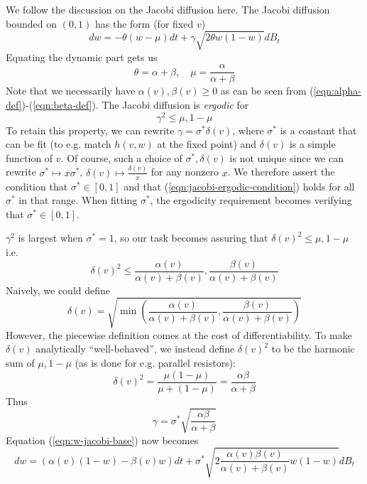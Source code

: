 \documentclass[letterpaper,12pt]{article}
\numberwithin{table}{section}
\numberwithin{figure}{section}
\numberwithin{equation}{section}
\begin{document}
\begin{flushleft}
    We follow the discussion \cite{dg} on the Jacobi diffusion here. The Jacobi diffusion bounded on $(0, 1)$ has the form (for fixed $v$)
    \begin{equation}
        \label{eqn:w-jacobi-base}
        dw = -\theta (w - \mu) dt + \gamma\sqrt{2\theta w (1 - w)} dB_t
    \end{equation}
    Equating the dynamic part gets us
    \begin{equation}
        \theta = \alpha + \beta, \quad \mu = \frac{\alpha}{\alpha + \beta}
    \end{equation}
    Note that we necessarily have $\alpha(v), \beta(v) \geq 0$ as can be seen from (\ref{eqn:alpha-def})-(\ref{eqn:beta-def}). The Jacobi diffusion is \textit{ergodic} for
    \begin{equation}
        \label{eqn:jacobi-ergodic-condition}
        \gamma^2 \leq \mu, 1 - \mu
    \end{equation}
    To retain this property, we can rewrite $\gamma = \sigma^* \delta(v)$, where $\sigma^*$ is a constant that can be fit (to e.g. match $h(v, w)$ at the fixed point) and $\delta(v)$ is a simple function of $v$. Of course, such a choice of $\sigma^*, \delta(v)$ is not unique since we can rewrite $\sigma^* \mapsto x\sigma^*$, $\delta(v) \mapsto \frac{\delta(v)}{x}$ for any nonzero $x$. We therefore assert the condition that $\sigma^* \in [0, 1]$ and that (\ref{eqn:jacobi-ergodic-condition}) holds for all $\sigma^*$ in that range. When fitting $\sigma^*$, the ergodicity requirement becomes verifying that $\sigma^* \in [0, 1]$.

    $\gamma^2$ is largest when $\sigma^* = 1$, so our task becomes assuring that $\delta(v)^2 \leq \mu, 1 - \mu$ i.e.
    \begin{equation}
        \delta(v)^2 \leq \frac{\alpha(v)}{\alpha(v) + \beta(v)}, \frac{\beta(v)}{\alpha(v) + \beta(v)}
    \end{equation}
    Naively, we could define
    \begin{equation}
        \delta(v) = \sqrt{\min{\left(\frac{\alpha(v)}{\alpha(v) + \beta(v)}, \frac{\beta(v)}{\alpha(v) + \beta(v)}\right)}}
    \end{equation}
    However, the piecewise definition comes at the cost of differentiability. To make $\delta(v)$ analytically ``well-behaved'', we instead define $\delta(v)^2$ to be the harmonic sum of $\mu, 1 - \mu$ (as is done for e.g. parallel resistors):
    \begin{equation}
        \delta(v)^2 = \frac{\mu(1 - \mu)}{\mu + (1 - \mu)} = \frac{\alpha\beta}{\alpha + \beta}
    \end{equation}
    Thus
    \begin{equation}
        \gamma = \sigma^* \sqrt{\frac{\alpha\beta}{\alpha + \beta}}
    \end{equation}
    Equation (\ref{eqn:w-jacobi-base}) now becomes
    \begin{equation}
        \label{eqn:w-jacobi}
        dw = (\alpha(v) (1 - w) - \beta(v) w) dt + \sigma^* \sqrt{2\frac{\alpha(v)\beta(v)}{\alpha(v) + \beta(v)} w(1-w)} dB_t
    \end{equation}


\end{flushleft}
\end{document}
